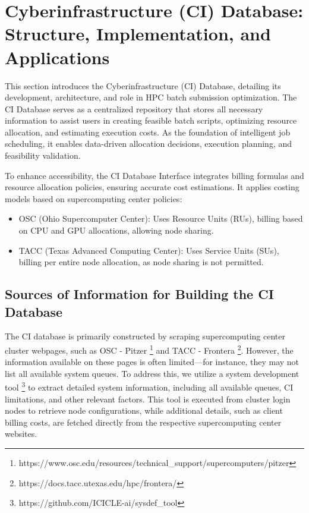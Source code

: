 \section{Cyberinfrastructure (CI) Database: Structure, Implementation, and Applications}
\label{Sec:CIDatabase}

This section introduces the Cyberinfrastructure (CI) Database, detailing its development, architecture, and role in HPC batch submission optimization. The CI Database serves as a centralized repository that stores all necessary information to assist users in creating feasible batch scripts, optimizing resource allocation, and estimating execution costs. As the foundation of intelligent job scheduling, it enables data-driven allocation decisions, execution planning, and feasibility validation.

To enhance accessibility, the CI Database Interface integrates billing formulas and resource allocation policies, ensuring accurate cost estimations. It applies costing models based on supercomputing center policies:
\begin{itemize}
    \item OSC (Ohio Supercomputer Center): Uses Resource Units (RUs), billing based on CPU and GPU allocations, allowing node sharing.
    \item TACC (Texas Advanced Computing Center): Uses Service Units (SUs), billing per entire node allocation, as node sharing is not permitted.
\end{itemize}

\subsection{Sources of Information for Building the CI Database}
The CI database is primarily constructed by scraping supercomputing center cluster webpages, such as OSC - Pitzer \footnote{https://www.osc.edu/resources/technical\_support/supercomputers/pitzer} and TACC - Frontera \footnote{https://docs.tacc.utexas.edu/hpc/frontera/}. However, the information available on these pages is often limited—for instance, they may not list all available system queues. To address this, we utilize a system development tool \footnote{https://github.com/ICICLE-ai/sysdef\_tool} to extract detailed system information, including all available queues, CI limitations, and other relevant factors. This tool is executed from cluster login nodes to retrieve node configurations, while additional details, such as client billing costs, are fetched directly from the respective supercomputing center websites.

